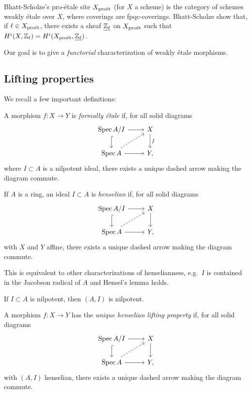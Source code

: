 \documentclass{article}
\begin{document}
Bhatt-Scholze's pro-\'etale site $X_{\mathrm{pro\acute{e}t}}$ (for $X$ a scheme) is the category of schemes weakly \'etale over $X$, where coverings are fpqc-coverings.
Bhatt-Scholze show that, if $\ell \in X_{\mathrm{pro\acute{e}t}}$, there exists a sheaf $\underline{\mathbb{Z}_\ell}$ on $X_{\mathrm{pro\acute{e}t}}$ such that $H^i(X, \mathbb{Z}_\ell) = H^i(X_{\mathrm{pro\acute{e}t}}, \underline{\mathbb{Z}_\ell})$.

Our goal is to give a \emph{functorial} characterization of weakly \'etale morphisms.

\subsection{Lifting properties}

We recall a few important definitions:

\begin{dfn}
	A morphism $f: X \to Y$ is \emph{formally \'etale} if, for all solid diagrams
	\[
  \begin{tikzcd}
		\Spec A / I \rar \dar[hook] & X \dar["f"] \\
		\Spec A \rar \ar[ur, dashed] & Y,
  \end{tikzcd}
	\]
	where $I \subset A$ is a nilpotent ideal, there exists a unique dashed arrow making the diagram commute.
\end{dfn}

\begin{dfn}
	If $A$ is a ring, an ideal $I \subset A$ is \emph{henselian} if, for all solid diagrams
	\[
  \begin{tikzcd}
		\Spec A / I \rar \dar[hook] & X \dar \\
		\Spec A \rar \ar[ur, dashed] & Y,
  \end{tikzcd}
	\]
	with $X$ and $Y$ affine, there exists a unique dashed arrow making the diagram commute.
\end{dfn}

This is equivalent to other characterizations of henselianness, e.g.\ $I$ is contained in the Jacobson radical of $A$ and Hensel's lemma holds.

\begin{ex}
	If $I \subset A$ is nilpotent, then $(A, I)$ is nilpotent.
\end{ex}

\begin{dfn}
	A morphism $f: X \to Y$ has the \emph{unique henselian lifting property} if, for all solid diagrams
	\[
  \begin{tikzcd}
		\Spec A / I \rar \dar[hook] & X \dar \\
		\Spec A \rar \ar[ur, dashed] & Y,
  \end{tikzcd}
	\]
	with $(A, I)$ henselian, there exists a unique dashed arrow making the diagram commute.
\end{dfn}
\end{document}
